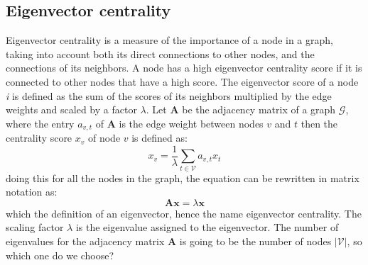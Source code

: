 \documentclass[12pt]{article}
\numberwithin{equation}{section}
\begin{document}
\begin{spacing}{1.5}
	\subsection{Eigenvector centrality}
	Eigenvector centrality is a measure of the importance of a node in a graph, taking into account both its direct connections to other nodes, and the connections of its neighbors. A node has a high eigenvector centrality score if it is connected to other nodes that have a high score. The eigenvector score of a node \textit{i} is defined as the sum of the scores of its neighbors multiplied by the edge weights and scaled by a factor $\lambda$. Let $\mathbf{A}$ be the adjacency matrix of a graph $\mathcal{G}$, where the entry $a_{v,t}$ of $\mathbf{A}$ is the edge weight between nodes $v$ and $t$ then the centrality score $x_v$ of node $v$ is defined as:
	\begin{equation}\label{eigenvector_1}
		x_v = \frac{1}{\lambda} \sum_{t \in \mathcal{V}} a_{v,t} x_t
	\end{equation}
	doing this for all the nodes in the graph, the equation can be rewritten in matrix notation as:
	\begin{equation}\label{eigenvector_2}
		\mathbf{A}\mathbf{x} = \lambda \mathbf{x}
	\end{equation}
	which the definition of an eigenvector, hence the name eigenvector centrality. The scaling factor $\lambda$ is the eigenvalue assigned to the eigenvector. The number of eigenvalues for the adjacency matrix $\mathbf{A}$ is going to be the number of nodes $|\mathcal{V}|$, so which one do we choose?
	

\end{spacing}
\end{document}
